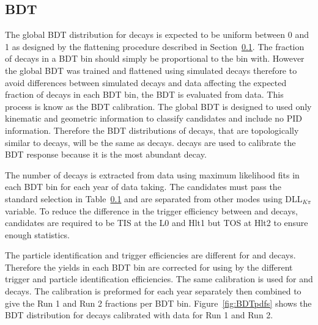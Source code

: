 \subsection{BDT \pdfs}
The global BDT distribution for \bmumu decays is expected to be uniform between 0 and 1 as designed by the flattening procedure described in Section~\ref{}. The fraction of \bmumu decays in a BDT bin should simply be proportional to the bin with. However the global BDT was trained and flattened using simulated decays therefore to avoid  differences between simulated decays and data affecting the expected fraction of \bmumu decays in each BDT bin, the BDT \pdf is evaluated from data. This process is know as the BDT calibration.
The global BDT is designed to used only kinematic and geometric information to classify candidates and include no PID information. Therefore the BDT distributions of \bhh decays, that are topologically similar to \bmumu decays, will be the same as \bmumu decays. \bdkpi decays are used to calibrate the BDT response because it is the most abundant \bhh decay. 

The number of \bdkpi decays is extracted from data using maximum likelihood fits in each BDT bin for each year of data taking. The \bdkpi candidates must pass the standard \bhh selection in Table~\ref{} and are separated from other \bhh modes using  DLL$_{K\pi}$ variable. To reduce the difference in the trigger efficiency between \bdkip and \bmumu decays, \bdkpi candidates are required to be TIS at the L0 and Hlt1 but TOS at Hlt2 to ensure enough statistics.

The particle identification and trigger efficiencies are different for \bdkpi and \bmumu decays. Therefore the \bdkpi yields in each BDT bin are corrected for using by the different trigger and particle identification efficiencies. The same calibration is used for \bsmumu and \bdmumu decays.
The calibration is preformed for each year separately then combined to give the Run 1 and Run 2 fractions per BDT bin. Figure~\ref{fig:BDTpdfs} shows the BDT distribution for \bmumu decays calibrated with \bdkpi data for Run 1 and Run 2. 

